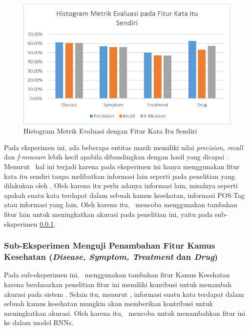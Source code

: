 	\begin{figure}
	  \centering
	  \includegraphics[width=0.85\linewidth]{images/histogram00}
	  \caption{Histogram Metrik Evaluasi dengan Fitur Kata Itu Sendiri}
	  \label{fig:own1}
	\end{figure}
		
	Pada eksperimen ini, ada beberapa entitas masih memiliki nilai \textit{precision, recall} dan \textit{f-measure} lebih kecil apabila dibandingkan dengan hasil yang dicapai \cite{skripsiKakRadit}. Menurut \saya~hal ini terjadi karena pada eksperimen ini hanya menggunakan fitur kata itu sendiri tanpa melibatkan informasi lain seperti pada penelitian yang dilakukan oleh \cite{skripsiKakRadit}. Oleh karena itu perlu adanya informasi lain, misalnya seperti apakah suatu kata terdapat dalam sebuah kamus kesehatan, informasi POS-Tag atau informasi yang lain. Oleh karena itu, \saya~mencoba menggunakan tambahan fitur lain untuk meningkatkan akurasi pada penelitian ini, yaitu pada sub-eksperimen \ref{eks:subeksdict}.
	
	\subsubsection{Sub-Eksperimen Menguji Penambahan Fitur Kamus Kesehatan (\textit{Disease, Symptom, Treatment} dan \textit{Drug})}\label{eks:subeksdict}
	Pada sub-eksperimen ini, \saya~menggunakan tambahan fitur Kamus Kesehatan karena berdasarkan penelitian \cite{skripsiKakRadit} fitur ini memiliki konribusi untuk menambah akurasi pada sistem \mer. Selain itu, menurut \saya, informasi suatu kata terdapat dalam sebuah kamus kesehatan mungkin akan memberikan kontribusi untuk meningkatkan akurasi. Oleh karena itu, \saya~mencoba untuk menambahkan fitur ini ke dalam model RNNs.
	
